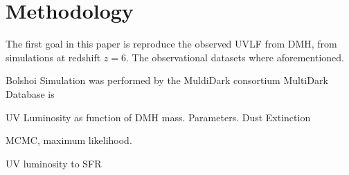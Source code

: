 \section{Methodology}

The first goal in this paper is reproduce the observed UVLF from DMH, from
 simulations at redshift $z=6$. The observational datasets where aforementioned.

Bolshoi Simulation \citep{riebe13} was performed by the MuldiDark consortium
MultiDark Database is 

UV Luminosity as function of DMH mass. 
Parameters.
Dust Extinction


MCMC, maximum likelihood.

UV luminosity to SFR